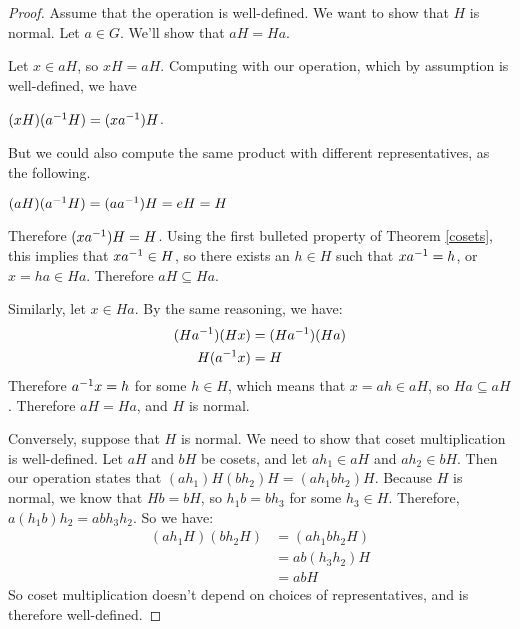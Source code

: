 \begin{proof}

Assume that the operation is well-defined. We want to show that $H$ is normal. Let $a \in G$. We'll show that $aH = Ha$.

Let $x \in aH$, so $xH = aH$. Computing with our operation, which by assumption is well-defined, we have

\begin{center}
    $(xH)(a^{-1} H) = (xa^{-1})H$.
\end{center}

But we could also compute the same product with different representatives, as the following.

\begin{center}
    $(aH)(a^{-1} H) = (a a^{-1})H = eH = H$
\end{center}

Therefore $(xa^{-1})H = H$. Using the first bulleted property of Theorem \ref{cosets}, this implies that $xa^{-1} \in H$, so there exists an $h \in H$ such that $xa^{-1} = h$, or $x = ha \in Ha$. Therefore $aH \subseteq Ha$.

Similarly, let $x \in Ha$. By the same reasoning, we have:
\begin{align*}
    (Ha^{-1})(Hx) &= (Ha^{-1})(Ha) \\
    H(a^{-1} x) &= H
\end{align*}
Therefore $a^{-1} x = h$ for some $h \in H$, which means that $x = ah \in aH$, so $Ha \subseteq aH$. Therefore $aH = Ha$, and $H$ is normal.

Conversely, suppose that $H$ is normal. We need to show that coset multiplication is well-defined. Let $aH$ and $bH$ be cosets, and let $ah_1 \in aH$ and $ah_2 \in bH$. Then our operation states that $(ah_1)H(bh_2)H = (ah_1bh_2)H$. Because $H$ is normal, we know that $Hb = bH$, so $h_1 b = b h_3$ for some $h_3 \in H$. Therefore, $a\left(h_1b\right) h_2 = ab h_3 h_2$. So we have:
\begin{align*}
    \left(ah_1 H\right)\left(bh_2 H\right) &= \left(ah_1bh_2 H\right) \\
    &= ab\left(h_3 h_2\right)H \\
    &= ab H
\end{align*}
So coset multiplication doesn't depend on choices of representatives, and is therefore well-defined.

\end{proof}

